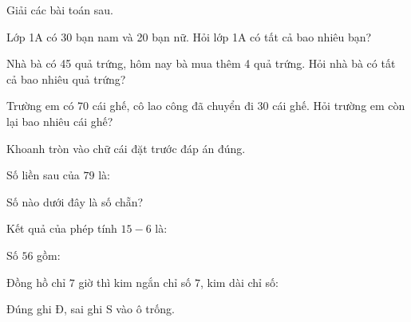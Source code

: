 \documentclass[../main.tex]{subfiles}
\begin{document}
\begin{bt}
    Giải các bài toán sau.
    \begin{listEX}
        \item Lớp 1A có 30 bạn nam và 20 bạn nữ. Hỏi lớp 1A có tất cả bao nhiêu bạn?
        \OTkhungpt
        \item Nhà bà có 45 quả trứng, hôm nay bà mua thêm 4 quả trứng. Hỏi nhà bà có tất cả bao nhiêu quả trứng?
        \OTkhungpt
        \item Trường em có 70 cái ghế, cô lao công đã chuyển đi 30 cái ghế. Hỏi trường em còn lại bao nhiêu cái ghế?
        \OTkhungpt
    \end{listEX}
\end{bt}
\begin{bt}
    Khoanh tròn vào chữ cái đặt trước đáp án đúng.
    \par\nopagebreak
    \begin{listEX}
        \item Số liền sau của $79$ là:
        \item Số nào dưới đây là số chẵn?
        \item Kết quả của phép tính $15-6$ là:
        \item Số $56$ gồm:
        \item Đồng hồ chỉ $7$ giờ thì kim ngắn chỉ số $7$, kim dài chỉ số:
    \end{listEX}
\end{bt}
\begin{bt}
    Đúng ghi Đ, sai ghi S vào ô trống.
    \par\nopagebreak\vspace{4pt}
\end{bt}
\end{document}

